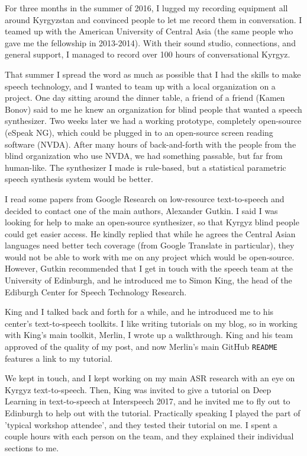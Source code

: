 \documentclass[12pt,a4paper]{article}
\begin{document}
For three months in the summer of 2016, I lugged my recording equipment all around Kyrgyzstan and convinced people to let me record them in conversation. I teamed up with the American University of Central Asia (the same people who gave me the fellowship in 2013-2014). With their sound studio, connections, and general support, I managed to record over 100 hours of conversational Kyrgyz.

That summer I spread the word as much as possible that I had the skills to make speech technology, and I wanted to team up with a local organization on a project. One day sitting around the dinner table, a friend of a friend (Kamen Bonov) said to me he knew an organization for blind people that wanted a speech synthesizer. Two weeks later we had a working prototype, completely open-source (eSpeak NG), which could be plugged in to an open-source screen reading software (NVDA). After many hours of back-and-forth with the people from the blind organization who use NVDA, we had something passable, but far from human-like. The synthesizer I made is rule-based, but a statistical parametric speech synthesis system would be better.

I read some papers from Google Research on low-resource text-to-speech and decided to contact one of the main authors, Alexander Gutkin. I said I was looking for help to make an open-source synthesizer, so that Kyrgyz blind people could get easier access. He kindly replied that while he agrees the Central Asian languages need better tech coverage (from Google Translate in particular), they would not be able to work with me on any project which would be open-source. However, Gutkin recommended that I get in touch with the speech team at the University of Edinburgh, and he introduced me to Simon King, the head of the Ediburgh Center for Speech Technology Research.

King and I talked back and forth for a while, and he introduced me to his center's text-to-speech toolkits. I like writing tutorials on my blog, so in working with King's main toolkit, Merlin, I wrote up a walkthrough. King and his team approved of the quality of my post, and now Merlin's main GitHub \texttt{README} features a link to my tutorial.

We kept in touch, and I kept working on my main ASR research with an eye on Kyrgyz text-to-speech. Then, King was invited to give a tutorial on Deep Learning in text-to-speech at Interspeech 2017, and he invited me to fly out to Edinburgh to help out with the tutorial. Practically speaking I played the part of 'typical workshop attendee', and they tested their tutorial on me. I spent a couple hours with each person on the team, and they explained their individual sections to me.
\end{document}
